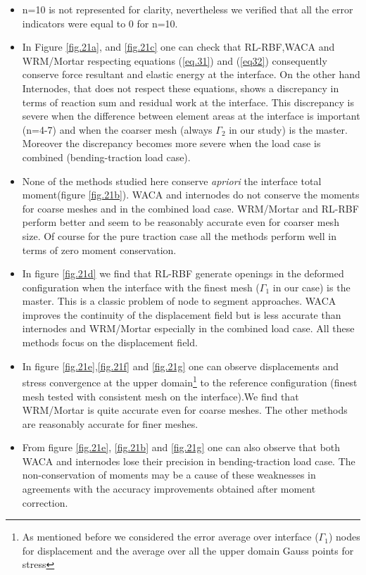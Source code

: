  \begin{itemize}
     \item n=10 is not represented for clarity, nevertheless we verified that all the error indicators were equal to 0 for n=10.
     \item In Figure  \ref{fig.21a}, and \ref{fig.21c} one can check that RL-RBF,WACA and WRM/Mortar respecting equations (\ref{eq.31}) and (\ref{eq32}) consequently conserve force resultant and elastic energy at the interface. On the other hand Internodes, that does not respect these equations, shows a discrepancy in terms of reaction sum and residual work at the interface. This discrepancy is severe when the difference between element areas at the interface is important (n=4-7) and when the coarser mesh (always $\Gamma_2$ in our study) is the master. Moreover the discrepancy becomes more severe when the load case is combined (bending-traction load case).
     \item None of the methods studied here conserve \textit{apriori} the interface total moment(figure \ref{fig.21b}). WACA and internodes do not conserve the moments for coarse meshes and in the combined load case. WRM/Mortar and RL-RBF perform better and seem to be reasonably accurate even for coarser mesh size. Of course for the pure traction case all the methods perform well in terms of zero moment conservation.
     \item In figure \ref{fig.21d} we find that RL-RBF generate openings in the deformed configuration when the interface with the finest mesh ($\Gamma_1$ in our case) is the master. This is a classic problem of node to segment approaches. WACA improves the continuity of the displacement field but is less accurate than internodes and WRM/Mortar especially in the combined load case. All these methods focus on the displacement field. 
     \item In figure \ref{fig.21e},\ref{fig.21f} and \ref{fig.21g} one can observe displacements and stress convergence at the upper domain\footnote{As mentioned before we considered the error average over interface ($\Gamma_1$) nodes for displacement and the average over all the upper domain Gauss points for stress} to the reference configuration (finest mesh tested with consistent mesh on the interface).We find that WRM/Mortar is quite accurate even for coarse meshes. The other methods are reasonably accurate for finer meshes.
     \item From figure \ref{fig.21e}, \ref{fig.21b} and \ref{fig.21g} one can also observe that both WACA and internodes lose their precision in bending-traction load case. The non-conservation of moments may be a cause of these weaknesses in agreements with the accuracy improvements obtained after moment correction.

\end{itemize}
